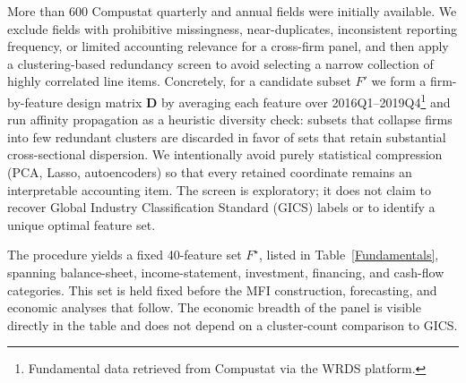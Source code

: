 \documentclass[pdflatex,sn-mathphys-num]{sn-jnl}%
\theoremstyle{thmstyleone}%
\theoremstyle{thmstyletwo}%
\theoremstyle{thmstylethree}%
\begin{document}
More than 600 Compustat quarterly and annual fields were initially available. We exclude fields with prohibitive missingness, near-duplicates, inconsistent reporting frequency, or limited accounting relevance for a cross-firm panel, and then apply a clustering-based redundancy screen to avoid selecting a narrow collection of highly correlated line items. Concretely, for a candidate subset $\mathit{F}'$ we form a firm-by-feature design matrix $\mathbf{D}$ by averaging each feature over 2016Q1--2019Q4\footnote{Fundamental data retrieved from Compustat via the WRDS platform.} and run affinity propagation \citep{frey2007clustering,dueck2009affinity} as a heuristic diversity check: subsets that collapse firms into few redundant clusters are discarded in favor of sets that retain substantial cross-sectional dispersion. We intentionally avoid purely statistical compression (PCA, Lasso, autoencoders) so that every retained coordinate remains an interpretable accounting item. The screen is exploratory; it does not claim to recover Global Industry Classification Standard (GICS) labels or to identify a unique optimal feature set.

The procedure yields a fixed 40-feature set $\mathit{F}^\star$, listed in Table~\ref{Fundamentals}, spanning balance-sheet, income-statement, investment, financing, and cash-flow categories. This set is held fixed before the MFI construction, forecasting, and economic analyses that follow. The economic breadth of the panel is visible directly in the table and does not depend on a cluster-count comparison to GICS.
\end{document}
